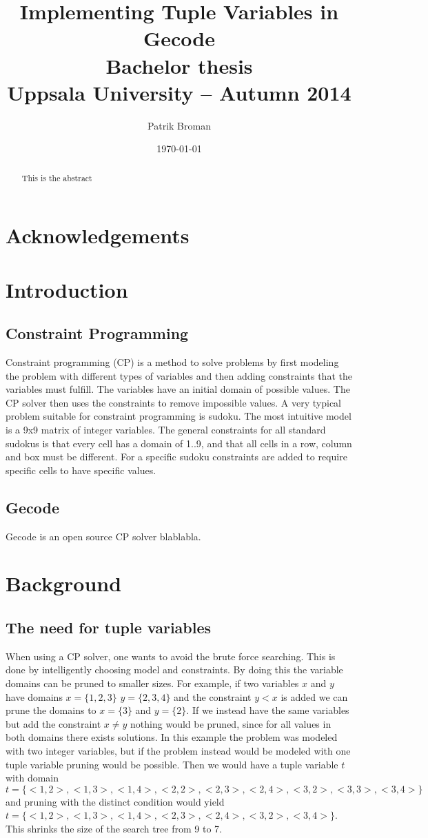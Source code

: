 \documentclass[a4paper,11pt]{article}
\title{\textbf{Implementing Tuple Variables in Gecode \\
	Bachelor thesis \\
    Uppsala University -- Autumn 2014 \\
  }
}
\author{Patrik Broman}
\date{\today}
\begin{document}
\begin{abstract}
This is the abstract
\end{abstract}

\tableofcontents
\section{Acknowledgements}

\section{Introduction}
\subsection{Constraint Programming}

Constraint programming (CP) is a method to solve problems by first modeling the problem with different types of variables and then adding constraints that the variables must fulfill. The variables have an initial domain of possible values. The CP solver then uses the constraints to remove impossible values. A very typical problem suitable for constraint programming is sudoku. The most intuitive model is a 9x9 matrix of integer variables. The general constraints for all standard sudokus is that every cell has a domain of 1..9, and that all cells in a row, column and box must be different. For a specific sudoku constraints are added to require specific cells to have specific values.

\subsection{Gecode}
Gecode is an open source CP solver blablabla.

\section{Background}
\subsection{The need for tuple variables}
When using a CP solver, one wants to avoid the brute force searching. This is done by intelligently choosing model and constraints. By doing this the variable domains can be pruned to smaller sizes. For example, if two variables $x$ and $y$ have domains $x=\{1,2,3\}$ $y=\{2,3,4\}$ and the constraint $y<x$ is added we can prune the domains to $x=\{3\}$ and $y=\{2\}$. If we instead have the same variables but add the constraint $x\neq y$ nothing would be pruned, since for all values in both domains there exists solutions. In this example the problem was modeled with two integer variables, but if the problem instead would be modeled with one tuple variable pruning would be possible. Then we would have a tuple variable $t$ with domain $t=\{<1,2>,<1,3>,<1,4>,<2,2>,<2,3>,<2,4>,<3,2>,<3,3>,<3,4>\}$ and pruning with the distinct condition would yield $t=\{<1,2>,<1,3>,<1,4>,<2,3>,<2,4>,<3,2>,<3,4>\}$. This shrinks the size of the search tree from 9 to 7. 
\end{document}

